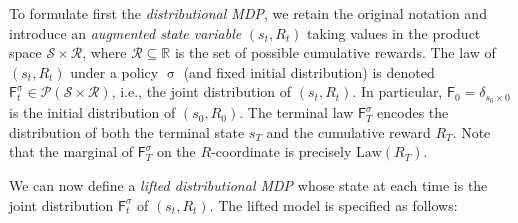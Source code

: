 \documentclass[reqno, 11pt]{amsart}%
\theoremstyle{definition}
\begin{document}
To formulate first the \emph{distributional MDP}, we retain the original notation and introduce an \emph{augmented state variable} $(s_t, R_t)$ taking values in the product space $\mathcal{S} \times \mathcal{R}$, where $\mathcal{R} \subseteq \mathbb{R}$ is the set of possible cumulative rewards. The law of $(s_t, R_t)$ under a policy $\upsigma$ (and fixed initial distribution) is denoted $\mathsf F_t^\upsigma \in \mathcal{P}(\mathcal{S} \times \mathcal{R})$, i.e., the joint distribution of $(s_t, R_t)$. In particular, $\mathsf F_0 = \delta_{s_0 \times 0}$ is the initial distribution of $(s_0, R_0)$. The terminal law $\mathsf F_T^\sigma$ encodes the distribution of both the terminal state $s_T$ and the cumulative reward $R_T$. Note that the marginal of $\mathsf F_T^\sigma$ on the $R$-coordinate is precisely $\text{Law}(R_T)$. 

We can now define a \emph{lifted distributional MDP} whose state at each time is the joint distribution $\mathsf F_t^\sigma$ of  $(s_t, R_t)$. The lifted model is specified as follows:
\end{document}
